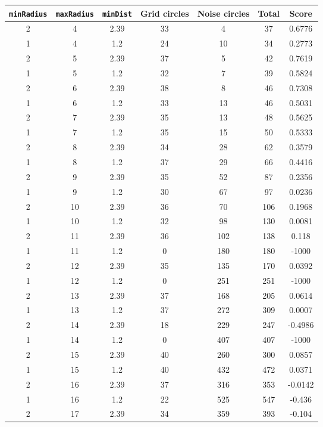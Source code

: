 \documentclass[letterpaper, 12pt]{article}
\begin{document}
\begin{longtable}{|c|c|c|c|c|c|c|}
\hline
\textbf{\texttt{minRadius}} & \textbf{\texttt{maxRadius}} & \textbf{\texttt{minDist}} & \textbf{Grid circles} & \textbf{Noise circles} & \textbf{Total} & \textbf{Score} \\
\hline
2 & 4 & 2.39 & 33 & 4 & 37 & 0.6776 \\
\hline
1 & 4 & 1.2 & 24 & 10 & 34 & 0.2773 \\
\hline
2 & 5 & 2.39 & 37 & 5 & 42 & 0.7619 \\
\hline
1 & 5 & 1.2 & 32 & 7 & 39 & 0.5824 \\
\hline
2 & 6 & 2.39 & 38 & 8 & 46 & 0.7308 \\
\hline
1 & 6 & 1.2 & 33 & 13 & 46 & 0.5031 \\
\hline
2 & 7 & 2.39 & 35 & 13 & 48 & 0.5625 \\
\hline
1 & 7 & 1.2 & 35 & 15 & 50 & 0.5333 \\
\hline
2 & 8 & 2.39 & 34 & 28 & 62 & 0.3579 \\
\hline
1 & 8 & 1.2 & 37 & 29 & 66 & 0.4416 \\
\hline
2 & 9 & 2.39 & 35 & 52 & 87 & 0.2356 \\
\hline
1 & 9 & 1.2 & 30 & 67 & 97 & 0.0236 \\
\hline
2 & 10 & 2.39 & 36 & 70 & 106 & 0.1968 \\
\hline
1 & 10 & 1.2 & 32 & 98 & 130 & 0.0081 \\
\hline
2 & 11 & 2.39 & 36 & 102 & 138 & 0.118 \\
\hline
1 & 11 & 1.2 & 0 & 180 & 180 & -1000 \\
\hline
2 & 12 & 2.39 & 35 & 135 & 170 & 0.0392 \\
\hline
1 & 12 & 1.2 & 0 & 251 & 251 & -1000 \\
\hline
2 & 13 & 2.39 & 37 & 168 & 205 & 0.0614 \\
\hline
1 & 13 & 1.2 & 37 & 272 & 309 & 0.0007 \\
\hline
2 & 14 & 2.39 & 18 & 229 & 247 & -0.4986 \\
\hline
1 & 14 & 1.2 & 0 & 407 & 407 & -1000 \\
\hline
2 & 15 & 2.39 & 40 & 260 & 300 & 0.0857 \\
\hline
1 & 15 & 1.2 & 40 & 432 & 472 & 0.0371 \\
\hline
2 & 16 & 2.39 & 37 & 316 & 353 & -0.0142 \\
\hline
1 & 16 & 1.2 & 22 & 525 & 547 & -0.436 \\
\hline
2 & 17 & 2.39 & 34 & 359 & 393 & -0.104 \\

\end{longtable}
\end{document}
